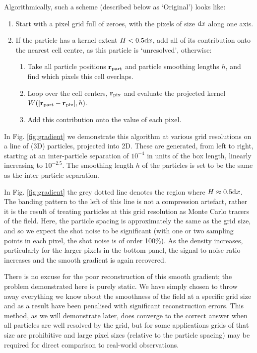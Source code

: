 Algorithmically, such a scheme (described below as `Original') looks like:
\begin{enumerate}
  \item Start with a pixel grid full of zeroes, with the pixels of size ${\rm d}x$ along one axis.
  \item If the particle has a kernel extent $H < 0.5 {\rm d}x$, add all of its contribution onto the nearest cell centre, as this particle is `unresolved', otherwise:
  \begin{enumerate}
    \item Take all particle positions $\mathbf{r}_{\rm part}$ and particle  smoothing lengths $h$, and find which pixels this cell overlaps.
    \item Loop over the cell centers, $\mathbf{r}_{\rm pix}$ and evaluate the projected kernel $W(|\mathbf{r}_{\rm part} - \mathbf{r}_{\rm pix}|, h)$.
    \item Add this contribution onto the value of each pixel.
  \end{enumerate}
\end{enumerate}

In Fig. \ref{fig:gradient} we demonstrate this algorithm at various grid resolutions on a line of (3D) particles, projected into 2D. These are generated, from left to right, starting at an inter-particle separation of $10^{-4}$ in units of the box length, linearly increasing to $10^{-2.5}$. The smoothing length $h$ of the particles is set to be the same as the inter-particle separation.

In Fig. \ref{fig:gradient} the grey dotted line denotes the region where $H \approx 0.5 {\rm d}x$. The banding pattern to the left of this line is not a compression artefact, rather
it is the result of treating particles at this grid resolution as Monte Carlo
tracers of the field. Here, the particle spacing is approximately the same as the grid size, and so we expect the shot noise to be significant (with one or two sampling points in each pixel, the shot noise is of order 100\%). As the density increases, particularly for the larger pixels in the bottom panel, the signal to noise ratio increases and the smooth gradient is again recovered.

There is no excuse for the poor reconstruction of this smooth gradient; the problem demonstrated here is purely static. We have simply chosen to throw away everything we know about the smoothness of the field at a specific grid size and as a result have been penalised with significant reconstruction errors. This method, as we will demonstrate later, does converge to the correct answer when all particles are well resolved by the grid, but for some applications grids of that size are prohibitive and large pixel sizes (relative to the particle spacing) may be required for direct comparison to real-world observations.